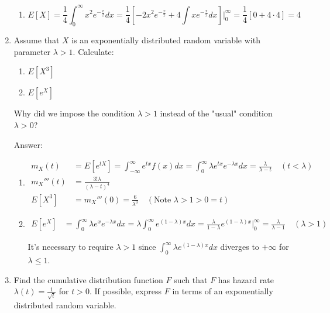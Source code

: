\documentclass{article}
\begin{document}
\begin{enumerate}
\begin{enumerate}
\item

$$
E[X] = \frac{1}{4}\int_0^\infty x^2 e^{-\frac{x}{2}} dx 
= \frac{1}{4}\left[-2x^2e^{-\frac{x}{2}} + 4\int xe^{-\frac{x}{2}} dx \right]\biggr \vert_0^\infty 
= \frac{1}{4}[0 + 4 \cdot 4] = \boxed{4}
$$
\end{enumerate}

\item

Assume that $X$ is an exponentially distributed random variable with parameter $\lambda > 1$. Calculate:

\begin{enumerate}
\item $E[X^3]$

\item $E[e^X]$ 
\end{enumerate}

Why did we impose the condition $\lambda > 1$ instead of the "usual" condition $\lambda > 0$?

Answer:

\begin{enumerate}
\item

\begin{align*}
m_X(t) &= E[e^{tX}] = \int_{-\infty}^\infty e^{tx} f(x) dx = \int_0^\infty \lambda e^{tx}e^{-\lambda x} dx = \frac{\lambda}{\lambda - t} \quad (t < \lambda) \\
m_X'''(t) &= \frac{3!\lambda}{(\lambda - t)^4}\\
E[X^3] &= m_X'''(0) = \boxed{\frac{6}{\lambda^3}} \quad (\text{Note } \lambda > 1 > 0 = t)
\end{align*}

\item

\begin{align*}
E[e^X] &= \int_0^\infty \lambda e^x e^{-\lambda x} dx =
\lambda \int_0^\infty e^{(1-\lambda)x} dx 
= \frac{\lambda}{1 -\lambda}e^{(1-\lambda) x} \biggr\vert_0^\infty
= \boxed{\frac{\lambda}{\lambda - 1} \quad (\lambda > 1)}
\end{align*}

It's necessary to require $\lambda > 1$ since $\int_0^\infty \lambda e^{(1-\lambda)x} dx$ diverges to $+\infty$ for $\lambda \leq 1$.
\end{enumerate}

\newpage
\item

Find the cumulative distribution function $F$ such that $F$ has hazard rate $\lambda(t) = \frac{1}{\sqrt{t}}$ for $t > 0$. If possible, express $F$ in terms of an exponentially distributed random variable. 


\end{enumerate}
\end{document}
